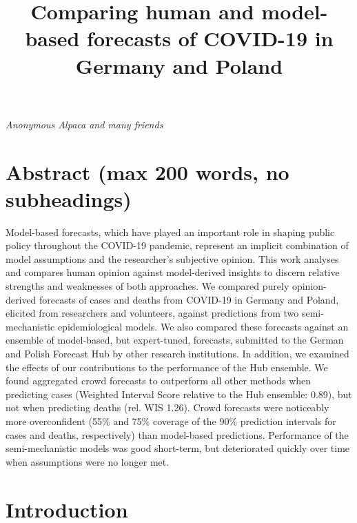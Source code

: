 \documentclass[
]{article}
\title{Comparing human and model-based forecasts of COVID-19 in Germany and Poland}
\author{}
\date{\vspace{-2.5em}}
\begin{document}
\maketitle

{
\setcounter{tocdepth}{2}
\tableofcontents
}
\emph{Anonymous Alpaca and many friends}

\hypertarget{abstract-max-200-words-no-subheadings}{%
\section{Abstract (max 200 words, no subheadings)}\label{abstract-max-200-words-no-subheadings}}

Model-based forecasts, which have played an important role in shaping public policy throughout the COVID-19 pandemic, represent an implicit combination of model assumptions and the researcher's subjective opinion. This work analyses and compares human opinion against model-derived insights to discern relative strengths and weaknesses of both approaches. We compared purely opinion-derived forecasts of cases and deaths from COVID-19 in Germany and Poland, elicited from researchers and volunteers, against predictions from two semi-mechanistic epidemiological models. We also compared these forecasts against an ensemble of model-based, but expert-tuned, forecasts, submitted to the German and Polish Forecast Hub by other research institutions. In addition, we examined the effects of our contributions to the performance of the Hub ensemble. We found aggregated crowd forecasts to outperform all other methods when predicting cases (Weighted Interval Score relative to the Hub ensemble: 0.89), but not when predicting deaths (rel. WIS 1.26). Crowd forecasts were noticeably more overconfident (55\% and 75\% coverage of the 90\% prediction intervals for cases and deaths, respectively) than model-based predictions. Performance of the semi-mechanistic models was good short-term, but deteriorated quickly over time when assumptions were no longer met.

\hypertarget{introduction}{%
\section{Introduction}\label{introduction}}
\end{document}
